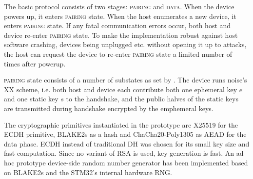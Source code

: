 \documentclass[12pt,a4paper,notitlepage]{article}
\begin{document}
The basic protocol consists of two stages: \textsc{pairing} and \textsc{data}. When the device powers up, it enters
\textsc{pairing} state. When the host enumerates a new device, it enters \textsc{pairing} state. If any fatal
communication errors occur, both host and device re-enter \textsc{pairing} state. To make the implementation robust
against host software crashing, devices being unplugged etc. without opening it up to attacks, the host can request the
device to re-enter \textsc{pairing} state a limited number of times after powerup.

\textsc{pairing} state consists of a number of substates as set by \textcite{perrin01}. The device runs noise's
\textsc{XX} scheme, i.e. both host and device each contribute both one ephemeral key $e$ and one static key $s$ to the
handshake, and the public halves of the static keys are transmitted during handshake encrypted by the emphemeral keys.

The cryptographic primitives instantiated in the prototype are X25519 for the ECDH primitive, BLAKE2s as a hash and
ChaCha20-Poly1305 as AEAD for the data phase. ECDH instead of traditional DH was chosen for its small key size and fast
computation. Since no variant of RSA is used, key generation is fast. An ad-hoc prototype device-side random number
generator has been implemented based on BLAKE2s and the STM32's internal hardware RNG.
\end{document}

